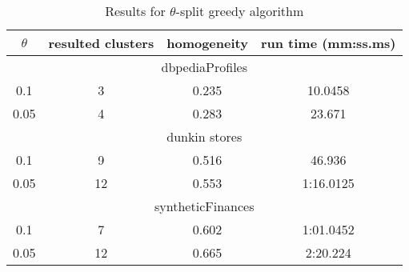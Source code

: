\begin{table}[H]
    \centering
    \begin{tabular}{|c|c|c|c|}
         \hline
         $\theta$ &  resulted clusters & homogeneity & run time (mm:ss.ms)\\
         \hline
         \multicolumn{4}{|c|}{dbpediaProfiles} \\
         \hline
         0.1 & 3 & 0.235 & 10.0458 \\
         0.05 &  4 & 0.283 & 23.671 \\
         \hline
         \multicolumn{4}{|c|}{dunkin stores} \\
         \hline
         0.1 & 9 & 0.516 &  46.936\\
         0.05 & 12 & 0.553 & 1:16.0125\\
         \hline
         \multicolumn{4}{|c|}{syntheticFinances} \\
         \hline
         0.1 & 7 &  0.602 & 1:01.0452 \\
         0.05 & 12 & 0.665 & 2:20.224\\
         \hline
    \end{tabular}
    \caption{Results for $\theta$-split greedy algorithm}
    \label{tab:results_theta_split}
\end{table}

